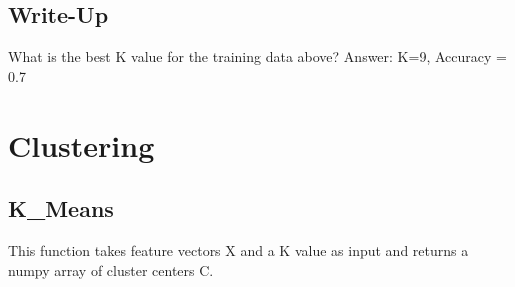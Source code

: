 \documentclass[11pt]{article}
\theoremstyle{definition}
\begin{document}
\subsection{Write-Up}
\begin{shaded}
What is the best K value for the training data above?
Answer: K=9, Accuracy = 0.7
\end{shaded}

\clearpage
\section{Clustering}
\subsection{K\_Means}
This function takes feature vectors \textsf{X} and a \textsf{K} value as input and returns a numpy array of cluster centers C. 
\end{document}
